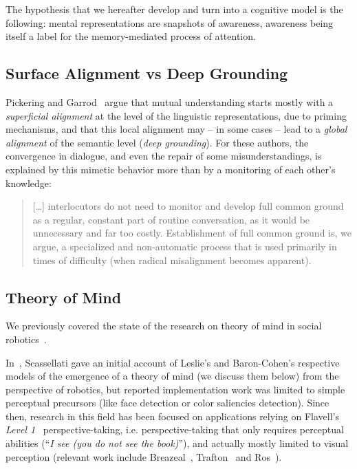 \documentclass[a4paper]{article}
\newcommand{\ie}{i.e.\xspace}
\begin{document}
The hypothesis that we hereafter develop and turn into a cognitive model is the
following: mental representations are snapshots of awareness, awareness being
itself a label for the memory-mediated process of attention.


\subsection{Surface Alignment vs Deep Grounding}

Pickering and Garrod~\cite{pickering2006alignment} argue that mutual understanding
starts mostly with a \emph{superficial alignment} at the level of the linguistic
representations, due to priming mechanisms, and that this local alignment may --
in some cases -- lead to a \emph{global alignment} of the semantic level
(\emph{deep grounding}).  For these authors, the convergence in dialogue, and
even the repair of some misunderstandings, is explained by this mimetic behavior
more than by a monitoring of each other's knowledge:

\begin{quote}
[\ldots] interlocutors do
not need to monitor and develop full common ground as a regular, constant
part of routine conversation, as it would be unnecessary and far too costly.
Establishment of full common ground is, we argue, a specialized and
non-automatic process that is used primarily in times of difficulty (when
radical misalignment becomes apparent).~\citep[p.179]{pickering2006alignment}
\end{quote}

\subsection{Theory of Mind}

We previously covered the state of the research on theory of mind in social
robotics~\cite{lemaignan2015mutual}.

In~\cite{scassellati2002theory}, Scassellati gave
an initial account of Leslie's and Baron-Cohen's respective models of the
emergence of a theory of mind (we discuss them below) from the perspective of
robotics, but reported implementation work was limited to simple perceptual
precursors (like face detection or color saliencies detection). Since then,
research in this field has been focused on applications relying on Flavell's
\emph{Level 1}~\cite{flavell1977development} perspective-taking, \ie
perspective-taking that only requires perceptual abilities (``\emph{I see (you do
not see the book)}''), and actually mostly limited to visual perception (relevant
work include Breazeal~\cite{breazeal2006using}, Trafton~\cite{Trafton2005} and
Ros~\cite{Ros2010}).
\end{document}

